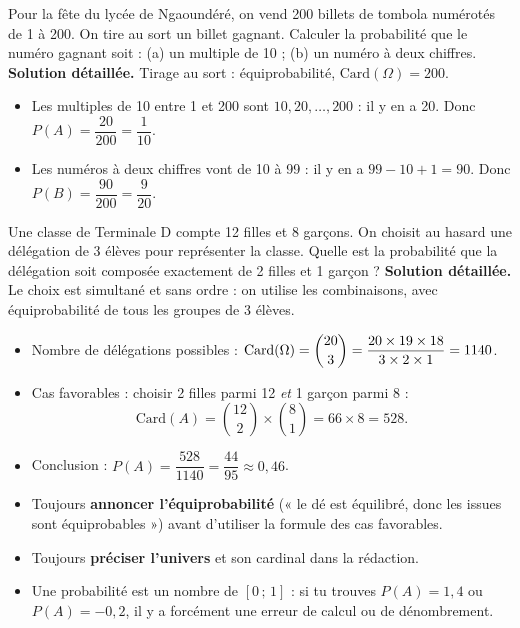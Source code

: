 \documentclass[11pt]{article}
\begin{document}
\begin{exoresolu}
Pour la fête du lycée de Ngaoundéré, on vend 200 billets de tombola numérotés de 1 à 200. On tire au sort un billet gagnant. Calculer la probabilité que le numéro gagnant soit : (a) un multiple de 10 ; (b) un numéro à deux chiffres.
\tcblower
\textbf{Solution détaillée.} Tirage au sort : équiprobabilité, $\mathrm{Card}(\Omega) = 200$.
\begin{itemize}
\item[(a)] Les multiples de 10 entre 1 et 200 sont $10, 20, \dots, 200$ : il y en a 20. Donc $P(A) = \dfrac{20}{200} = \dfrac{1}{10}$.
\item[(b)] Les numéros à deux chiffres vont de 10 à 99 : il y en a $99 - 10 + 1 = 90$. Donc $P(B) = \dfrac{90}{200} = \dfrac{9}{20}$.
\end{itemize}
\end{exoresolu}

\begin{exoresolu}
Une classe de Terminale D compte 12 filles et 8 garçons. On choisit au hasard une délégation de 3 élèves pour représenter la classe. Quelle est la probabilité que la délégation soit composée exactement de 2 filles et 1 garçon ?
\tcblower
\textbf{Solution détaillée.} Le choix est simultané et sans ordre : on utilise les combinaisons, avec équiprobabilité de tous les groupes de 3 élèves.
\begin{itemize}
\item Nombre de délégations possibles : $\mathrm{Card}(\Omega) = \dbinom{20}{3} = \dfrac{20 \times 19 \times 18}{3 \times 2 \times 1} = \num{1140}$.
\item Cas favorables : choisir 2 filles parmi 12 \emph{et} 1 garçon parmi 8 :
\[ \mathrm{Card}(A) = \binom{12}{2} \times \binom{8}{1} = 66 \times 8 = 528. \]
\item Conclusion : $P(A) = \dfrac{528}{\num{1140}} = \dfrac{44}{95} \approx 0{,}46$.
\end{itemize}
\end{exoresolu}

\begin{attention}
\begin{itemize}
\item Toujours \textbf{annoncer l'équiprobabilité} (« le dé est équilibré, donc les issues sont équiprobables ») avant d'utiliser la formule des cas favorables.
\item Toujours \textbf{préciser l'univers} et son cardinal dans la rédaction.
\item Une probabilité est un nombre de $[0\,;\,1]$ : si tu trouves $P(A) = 1{,}4$ ou $P(A) = -0{,}2$, il y a forcément une erreur de calcul ou de dénombrement.
\end{itemize}
\end{attention}
\end{document}
